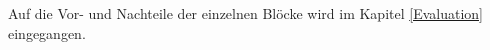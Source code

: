 \documentclass{article}
\begin{document}
    Auf die Vor- und Nachteile der einzelnen Blöcke wird im Kapitel \ref{Evaluation} eingegangen.

    \newpage
\end{document}
